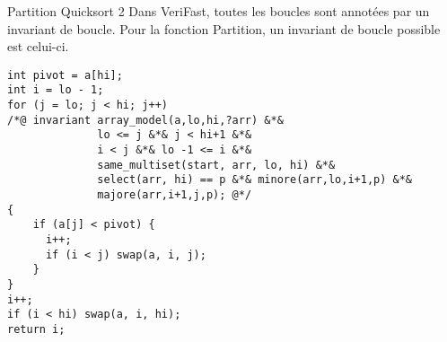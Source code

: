 \documentclass[9pt]{beamer}
\newcommand{\verifast}{VeriFast}
\begin{document}
\begin{frame}[fragile]{Partition Quicksort 2}
Dans \verifast, toutes les boucles sont annot\'ees par un invariant de boucle. Pour la fonction Partition, un invariant de boucle possible est celui-ci.
	\begin{lstlisting}[basicstyle=\footnotesize]
int pivot = a[hi];
int i = lo - 1;
for (j = lo; j < hi; j++)
/*@ invariant array_model(a,lo,hi,?arr) &*&
              lo <= j &*& j < hi+1 &*& 
              i < j &*& lo -1 <= i &*& 
              same_multiset(start, arr, lo, hi) &*& 
              select(arr, hi) == p &*& minore(arr,lo,i+1,p) &*& 
              majore(arr,i+1,j,p); @*/
{
    if (a[j] < pivot) {
      i++;
      if (i < j) swap(a, i, j);
    }
}
i++;
if (i < hi) swap(a, i, hi);
return i;
	\end{lstlisting}

\end{frame}
\end{document}
